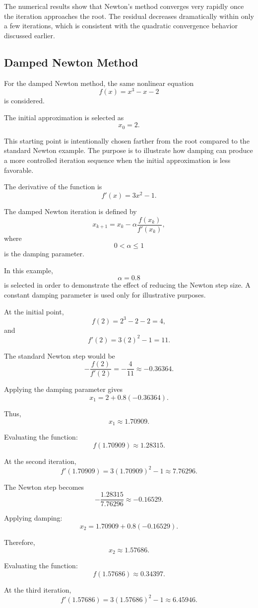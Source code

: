 The numerical results show that Newton's method converges very rapidly once the iteration approaches the root. The residual decreases dramatically within only a few iterations, which is consistent with the quadratic convergence behavior discussed earlier.

\subsection{Damped Newton Method}

For the damped Newton method, the same nonlinear equation
\[
f(x)=x^3-x-2
\]
is considered.

The initial approximation is selected as
\[
x_0=2.
\]

This starting point is intentionally chosen farther from the root compared to the standard Newton example. The purpose is to illustrate how damping can produce a more controlled iteration sequence when the initial approximation is less favorable.

The derivative of the function is
\[
f'(x)=3x^2-1.
\]

The damped Newton iteration is defined by
\[
x_{k+1}
=
x_k
-
\alpha
\frac{f(x_k)}{f'(x_k)},
\]
where
\[
0<\alpha\leq1
\]
is the damping parameter.

In this example,
\[
\alpha=0.8
\]
is selected in order to demonstrate the effect of reducing the Newton step size. A constant damping parameter is used only for illustrative purposes.

At the initial point,
\[
f(2)=2^3-2-2=4,
\]
and
\[
f'(2)=3(2)^2-1=11.
\]

The standard Newton step would be
\[
-\frac{f(2)}{f'(2)}
=
-\frac{4}{11}
\approx
-0.36364.
\]

Applying the damping parameter gives
\[
x_1
=
2
+
0.8(-0.36364).
\]

Thus,
\[
x_1
\approx
1.70909.
\]

Evaluating the function:
\[
f(1.70909)
\approx
1.28315.
\]

At the second iteration,
\[
f'(1.70909)
=
3(1.70909)^2-1
\approx
7.76296.
\]

The Newton step becomes
\[
-\frac{1.28315}{7.76296}
\approx
-0.16529.
\]

Applying damping:
\[
x_2
=
1.70909
+
0.8(-0.16529).
\]

Therefore,
\[
x_2
\approx
1.57686.
\]

Evaluating the function:
\[
f(1.57686)
\approx
0.34397.
\]

At the third iteration,
\[
f'(1.57686)
=
3(1.57686)^2-1
\approx
6.45946.
\]

